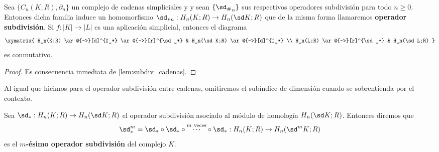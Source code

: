 \begin{proposicion}
	Sea $\{C_n(K;R), \partial_n\}$ un complejo de cadenas simpliciales y  y sean $\{{\sd_\#}_n\}$ sus respectivos operadores subdivisión para todo $n \geq 0$. Entonces dicha familia induce un homomorfismo ${\sd_*}_n: H_n(K;R) \to H_n(\sd K;R)$ que de la misma forma llamaremos \textbf{operador subdivisión}. Si $f: |K| \to |L|$ es una aplicación simplicial, entonces el diagrama
	\[
		\xymatrix{
			H_n(K;R) \ar@{->}[d]^{f_*} \ar@{->}[r]^{\sd_*} & H_n(\sd K;R) \ar@{->}[d]^{f_*} \\
			H_n(L;R) \ar@{->}[r]^{\sd_*} & H_n(\sd L;R)
		}
	\]
	es conmutativo.
\end{proposicion}
\begin{proof}
	Es consecuencia inmediata de \autoref{lem:subdiv_cadenas}.
\end{proof}
\begin{nota}
	Al igual que hicimos para el operador subdivisión entre cadenas, omitiremos el subíndice de dimensión cuando se sobrentienda por el contexto.
\end{nota}

\begin{definicion}
	Sea $\sd_*: H_n(K;R) \to H_n(\sd K;R)$ el operador subdivisión asociado al módulo de homología $H_n(\sd K;R)$. Entonces diremos que
	\[
		\sd_*^m = \sd_* \circ \sd_* \circ \overset{m\ \text{veces}}{\cdots} \circ \sd_*: H_n(K;R) \to H_n(\sd^m K;R)
	\]
	es el \textbf{$m$-ésimo operador subdivisión} del complejo $K$.
\end{definicion}

